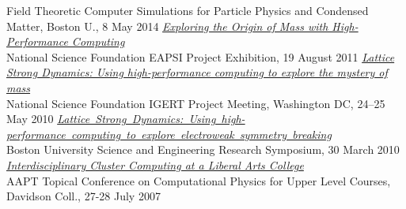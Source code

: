 \begin{spacelist}
\begin{revnumerate}
      Field Theoretic Computer Simulations for Particle Physics and Condensed Matter, Boston U., 8 May 2014
    \pagebreakitem
      \textit{\href{http://www.davidschaich.net/talks/SITposter.pdf}{Exploring the Origin of Mass with High-Performance Computing}} \\
      National Science Foundation EAPSI Project Exhibition, 19 August 2011
    \pagebreakitem
      \textit{\href{http://www.davidschaich.net/talks/IGERT.pdf}{Lattice Strong Dynamics: Using high-performance computing to explore the mystery of mass}} \\
      National Science Foundation IGERT Project Meeting, Washington DC, 24--25 May 2010
    \pagebreakitem
      \textit{\href{http://www.davidschaich.net/talks/BUsymposium.pdf}{Lattice~Strong~Dynamics:~Using~high-performance~computing~to~explore~electroweak~symmetry~breaking}} \\
      Boston University Science and Engineering Research Symposium, 30 March 2010
    \pagebreakitem
      \textit{\href{http://www.davidschaich.net/talks/AAPT07.pdf}{Interdisciplinary Cluster Computing at a Liberal Arts College}} \\
      AAPT Topical Conference on Computational Physics for Upper Level Courses, Davidson Coll., 27-28 July 2007
  \end{revnumerate}
\end{spacelist}
